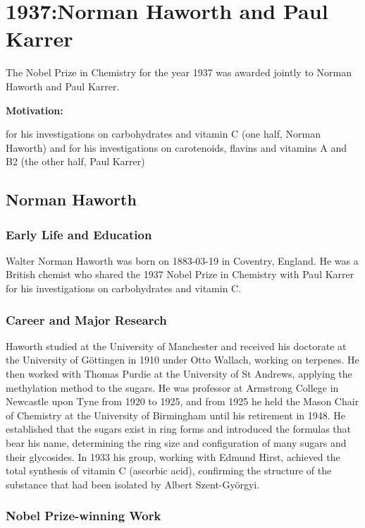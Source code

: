 \chapter{1937:Norman Haworth and Paul Karrer}

\label{chap:chemistry1937}

The Nobel Prize in Chemistry for the year 1937 was awarded jointly to Norman Haworth and Paul Karrer.

\textbf{Motivation:}

for his investigations on carbohydrates and vitamin C (one half, Norman Haworth) and for his investigations on carotenoids, flavins and vitamins A and B2 (the other half, Paul Karrer)

\section{Norman Haworth}

\subsection*{Early Life and Education}

Walter Norman Haworth was born on 1883-03-19 in Coventry, England.
He was a British chemist who shared the 1937 Nobel Prize in Chemistry with Paul Karrer for his investigations on carbohydrates and vitamin C.

\subsection*{Career and Major Research}

Haworth studied at the University of Manchester and received his doctorate at the University of Göttingen in 1910 under Otto Wallach, working on terpenes.
He then worked with Thomas Purdie at the University of St Andrews, applying the methylation method to the sugars.
He was professor at Armstrong College in Newcastle upon Tyne from 1920 to 1925, and from 1925 he held the Mason Chair of Chemistry at the University of Birmingham until his retirement in 1948.
He established that the sugars exist in ring forms and introduced the formulas that bear his name, determining the ring size and configuration of many sugars and their glycosides.
In 1933 his group, working with Edmund Hirst, achieved the total synthesis of vitamin C (ascorbic acid), confirming the structure of the substance that had been isolated by Albert Szent-Györgyi.

\subsection*{Nobel Prize-winning Work}


